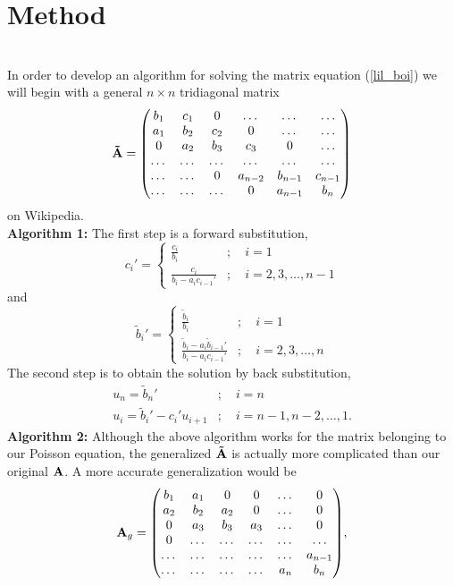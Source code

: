 \documentclass[notitlepage, reprint, nofootinbib]{revtex4-1}
\begin{document}
\section{Method}
{\color{red}{Include closed-form solution here as a part of unit test maybe??}}\\[2mm]
In order to develop an algorithm for solving the matrix equation (\ref{lil_boi}) we will begin with a general $n\times n$ tridiagonal matrix 
\begin{equation}\label{big_boi_bro}\vb{\tilde{A}} = \mqty(b_1&c_1&0&\dots&\dots&\dots\\a_1&b_2&c_2&0&\dots&\dots\\0&a_2&b_3&c_3&0&\dots\\ \dots&\dots&\dots&\dots&\dots&\dots\\ \dots&\dots&0&a_{n-2}&b_{n-1}&c_{n-1}\\ \dots&\dots&\dots&0&a_{n-1}&b_n)\end{equation}
{\color{red}{Reference Tridiagonal Matrix Algorithm}} on Wikipedia. \\[2mm]
\textbf{Algorithm 1:} The first step is a forward substitution, 
\begin{equation}c_i' =\begin{cases} \frac{c_i}{b_i}&; \quad i=1\\ \frac{c_i}{b_i-a_ic_{i-1}'}&;\quad i=2,3,\dots,n-1\end{cases}\end{equation}
and 
\begin{equation}\tilde{b}_i'=\begin{cases}\frac{\tilde{b}_i}{b_i}&;\quad i=1\\ \frac{\tilde{b}_i-a_i\tilde{b}_{i-1}'}{b_i-a_ic_{i-1}'}&;\quad i=2, 3,\dots,n\end{cases}\end{equation}
The second step is to obtain the solution by back substitution, 
\begin{align}
	u_n=\tilde{b}_n'&; \quad i=n\\
	u_i=\tilde{b}_i'-c_i'u_{i+1}&;\quad i=n-1,n-2,\dots,1.
\end{align}
\textbf{Algorithm 2:} Although the above algorithm works for the matrix belonging to our Poisson equation, the generalized $\vb{\tilde{A}}$ is actually more complicated than our original $\vb{A}$. A more accurate generalization would be 
\begin{equation}\label{another_big_boi}\vb{A}_g = \mqty(b_1&a_1&0&0&\dots&0\\a_2&b_2&a_2&0&\dots&0\\0&a_3&b_3&a_3&\dots&0\\ 0&\dots&\dots&\dots&\dots&\dots\\ \dots&\dots&\dots&\dots&\dots&a_{n-1}\\ \dots&\dots&\dots&\dots&a_n&b_n),\end{equation}
\end{document}
